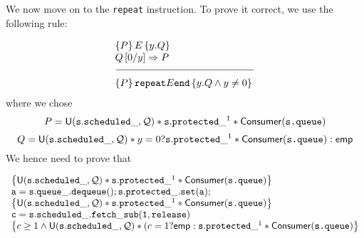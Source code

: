 We now move on to the \texttt{repeat} instruction. To prove it correct, we use the following rule:

\begin{equation*}
		\begin{array}{l}
			\left\{P\right\} E \left\{y.Q\right\} \\
			Q\left[0 / y \right] \Rightarrow P \\
				\frac{}{\textcolor{white}{\left\{ P\right\} \texttt{repeat} E \texttt{end} \left\{ y.iiiiiiiiiiiiiii Q \land y \neq 0 \right\}}}\\
			\left\{ P\right\} \texttt{repeat} E \texttt{end} \left\{ y. Q \land y \neq 0 \right\}
		\end{array}
\end{equation*}
where we chose 
$$P = \mathsf{U}(\mathtt{s.scheduled\_}, \mathcal{Q}) * \mathtt{s.protected\_}^1 * \mathsf{Consumer}(\texttt{s.queue}) $$
$$Q = \mathsf{U}(\mathtt{s.scheduled\_}, \mathcal{Q}) * y = 0 ? \mathtt{s.protected\_}^1 * \mathsf{Consumer}(\texttt{s.queue}): \mathsf{emp}  $$
We hence need to prove that 

\begin{equation*}
	\begin{array}{l}
		\left\{\mathsf{U}(\mathtt{s.scheduled\_}, \mathcal{Q}) * \mathtt{s.protected\_}^1 * \mathsf{Consumer}(\texttt{s.queue}) \right\} \\
		\mathtt{a = s.queue\_.dequeue(); s.protected\_.set(a);} \\
		\left\{\mathsf{U}(\mathtt{s.scheduled\_}, \mathcal{Q}) * \mathtt{s.protected\_}^1 * \mathsf{Consumer}(\texttt{s.queue}) \right\} \\
		\mathtt{c = s.scheduled\_.fetch\_sub(1, release)} \\
		\left\{ c \geq 1 \land \mathsf{U}(\mathtt{s.scheduled\_}, \mathcal{Q}) * (c = 1 ? \mathsf{emp} : \mathtt{s.protected\_}^1 * \mathsf{Consumer}(\texttt{s.queue}) \right\}
	\end{array}
\end{equation*}

